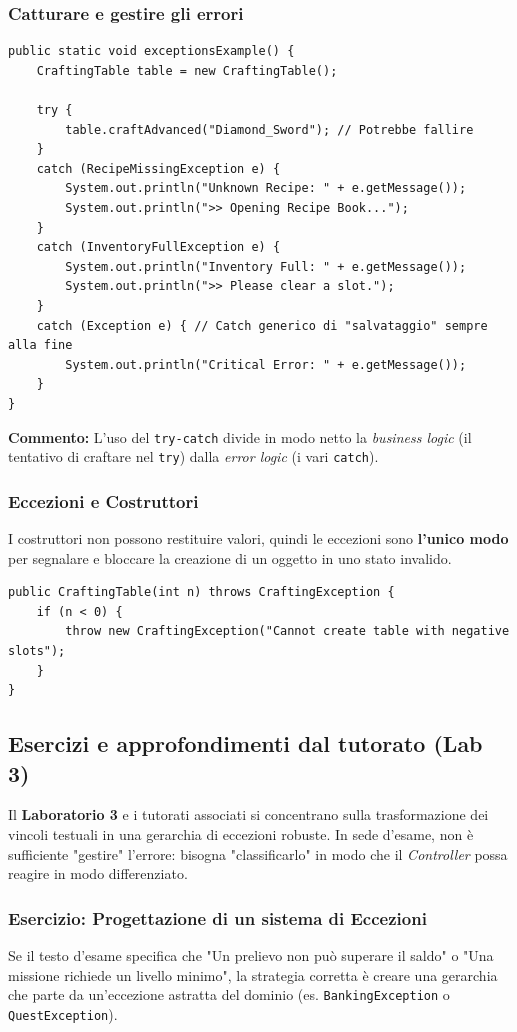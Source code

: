 \documentclass[12pt, a4paper]{article}
\begin{document}
\subsubsection{Catturare e gestire gli errori}
\begin{verbatim}
public static void exceptionsExample() {
    CraftingTable table = new CraftingTable();
    
    try {
        table.craftAdvanced("Diamond_Sword"); // Potrebbe fallire
    } 
    catch (RecipeMissingException e) {
        System.out.println("Unknown Recipe: " + e.getMessage());
        System.out.println(">> Opening Recipe Book...");
    } 
    catch (InventoryFullException e) {
        System.out.println("Inventory Full: " + e.getMessage());
        System.out.println(">> Please clear a slot.");
    } 
    catch (Exception e) { // Catch generico di "salvataggio" sempre alla fine
        System.out.println("Critical Error: " + e.getMessage());
    }
}
\end{verbatim}
\textbf{Commento:} L'uso del \texttt{try-catch} divide in modo netto la \textit{business logic} (il tentativo di craftare nel \texttt{try}) dalla \textit{error logic} (i vari \texttt{catch}). 

\newpage

\subsubsection{Eccezioni e Costruttori}
I costruttori non possono restituire valori, quindi le eccezioni sono \textbf{l'unico modo} per segnalare e bloccare la creazione di un oggetto in uno stato invalido.
\begin{verbatim}
public CraftingTable(int n) throws CraftingException {
    if (n < 0) {
        throw new CraftingException("Cannot create table with negative slots");
    }
}
\end{verbatim}

\subsection{Esercizi e approfondimenti dal tutorato (Lab 3)}
Il \textbf{Laboratorio 3} e i tutorati associati si concentrano sulla trasformazione dei vincoli testuali in una gerarchia di eccezioni robuste. In sede d'esame, non è sufficiente "gestire" l'errore: bisogna "classificarlo" in modo che il \textit{Controller} possa reagire in modo differenziato.

\subsubsection{Esercizio: Progettazione di un sistema di Eccezioni}
Se il testo d'esame specifica che "Un prelievo non può superare il saldo" o "Una missione richiede un livello minimo", la strategia corretta è creare una gerarchia che parte da un'eccezione astratta del dominio (es. \texttt{BankingException} o \texttt{QuestException}).
\end{document}
